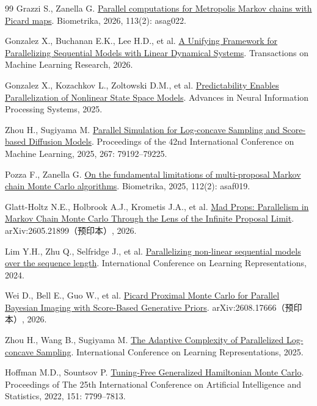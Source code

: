 \documentclass[UTF8,a4paper,zihao=-4,fontset=fandol]{ctexart}
\begin{document}
\begin{thebibliography}{99}
 Grazzi S., Zanella G.
\href{https://doi.org/10.1093/biomet/asag022}{Parallel computations for Metropolis Markov chains with Picard maps}.
Biometrika, 2026, 113(2): asag022.

 Gonzalez X., Buchanan E.K., Lee H.D., et al.
\href{https://openreview.net/forum?id=fw6GgAIGur}{A Unifying Framework for Parallelizing Sequential Models with Linear Dynamical Systems}.
Transactions on Machine Learning Research, 2026.

 Gonzalez X., Kozachkov L., Zoltowski D.M., et al.
\href{https://arxiv.org/abs/2508.16817v4}{Predictability Enables Parallelization of Nonlinear State Space Models}.
Advances in Neural Information Processing Systems, 2025.

 Zhou H., Sugiyama M.
\href{https://proceedings.mlr.press/v267/zhou25x.html}{Parallel Simulation for Log-concave Sampling and Score-based Diffusion Models}.
Proceedings of the 42nd International Conference on Machine Learning, 2025, 267: 79192–79225.

 Pozza F., Zanella G.
\href{https://doi.org/10.1093/biomet/asaf019}{On the fundamental limitations of multi-proposal Markov chain Monte Carlo algorithms}.
Biometrika, 2025, 112(2): asaf019.

 Glatt-Holtz N.E., Holbrook A.J., Krometis J.A., et al.
\href{https://arxiv.org/abs/2605.21899v1}{Mad Props: Parallelism in Markov Chain Monte Carlo Through the Lens of the Infinite Proposal Limit}.
arXiv:2605.21899（预印本）, 2026.

 Lim Y.H., Zhu Q., Selfridge J., et al.
\href{https://proceedings.iclr.cc/paper\_files/paper/2024/hash/f3bfbd65743e60c685a3845bd61ce15f-Abstract-Conference.html}{Parallelizing non-linear sequential models over the sequence length}.
International Conference on Learning Representations, 2024.

 Wei D., Bell E., Guo W., et al.
\href{https://arxiv.org/abs/2608.17666v1}{Picard Proximal Monte Carlo for Parallel Bayesian Imaging with Score-Based Generative Priors}.
arXiv:2608.17666（预印本）, 2026.

 Zhou H., Wang B., Sugiyama M.
\href{https://arxiv.org/abs/2408.13045v2}{The Adaptive Complexity of Parallelized Log-concave Sampling}.
International Conference on Learning Representations, 2025.

 Hoffman M.D., Sountsov P.
\href{https://proceedings.mlr.press/v151/hoffman22a.html}{Tuning-Free Generalized Hamiltonian Monte Carlo}.
Proceedings of The 25th International Conference on Artificial Intelligence and Statistics, 2022, 151: 7799–7813.


\end{thebibliography}
\end{document}
